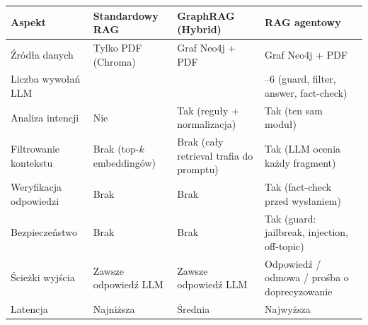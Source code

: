 \noindent
\begin{tabularx}{\textwidth}{@{} >{\raggedright\arraybackslash}p{2.4cm} >{\raggedright\arraybackslash}X >{\raggedright\arraybackslash}X >{\raggedright\arraybackslash}X @{}}
    \toprule
    \textbf{Aspekt} & \textbf{Standardowy RAG} & \textbf{GraphRAG (Hybrid)} & \textbf{RAG agentowy} \\
    \midrule
    Źródła danych &
    Tylko PDF (Chroma) &
  Graf Neo4j + PDF &
  Graf Neo4j + PDF \\
    \addlinespace
    Liczba wywołań LLM &
    1 &
  1 &
  4--6 (guard, filter, answer, fact-check) \\
    \addlinespace
    Analiza intencji &
    Nie &
  Tak (reguły + normalizacja) &
  Tak (ten sam moduł) \\
    \addlinespace
    Filtrowanie kontekstu &
    Brak (top-$k$ embeddingów) &
  Brak (cały retrieval trafia do promptu) &
  Tak (LLM ocenia każdy fragment) \\
    \addlinespace
    Weryfikacja odpowiedzi &
    Brak &
  Brak &
  Tak (fact-check przed wysłaniem) \\
    \addlinespace
    Bezpieczeństwo &
    Brak &
  Brak &
  Tak (guard: jailbreak, injection, off-topic) \\
    \addlinespace
    Ścieżki wyjścia &
    Zawsze odpowiedź LLM &
  Zawsze odpowiedź LLM &
  Odpowiedź / odmowa / prośba o doprecyzowanie \\
    \addlinespace
    Latencja &
    Najniższa &
  Średnia &
  Najwyższa \\
    \bottomrule
\end{tabularx}

\vspace{1em}

